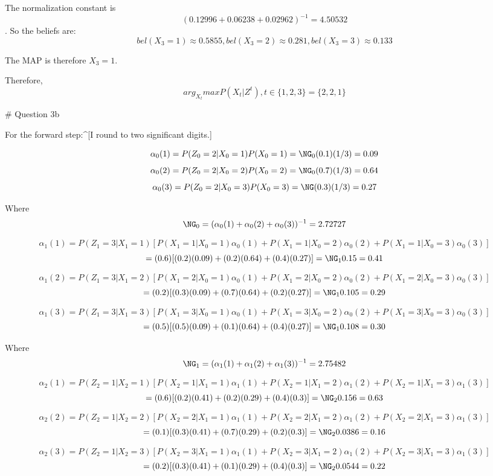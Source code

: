 The normalization constant is $$ (0.12996 + 0.06238 + 0.02962)^{-1} = 4.50532 $$. So the beliefs are: $$ bel(X_3 = 1) \approx 0.5855, bel(X_3 = 2) \approx 0.281, bel(X_3 = 3) \approx 0.133 $$

The MAP is therefore $X_3 = 1$.


Therefore, $$ arg_{X_t} max P(X_t | Z^t) , t \in \{1,2,3\} = \{2,2,1\}$$


# Question 3b

For the forward step:^[I round to two significant digits.]

$$ \alpha_0 (1)  = P(Z_0 = 2 | X_0 = 1) P(X_0 = 1) = \NG_0 (0.1)(1/3)  = 0.09 $$
$$ \alpha_0 (2)  = P(Z_0 = 2 | X_0 = 2) P(X_0 = 2) = \NG_0 (0.7)(1/3) = 0.64 $$
$$ \alpha_0 (3)  = P(Z_0 = 2 | X_0 = 3) P(X_0 = 3) = \NG (0.3)(1/3)  = 0.27 $$

Where $$ \NG_0 = (\alpha_0 (1) + \alpha_0 (2) + \alpha_0 (3))^{-1}  = 2.72727 $$

$$ \alpha_1 (1) = P(Z_1 = 3 | X_1 = 1) [ P(X_1 = 1 | X_0 = 1) \alpha_0 (1) + P(X_1 = 1 | X_0 = 2) \alpha_0 (2) + P(X_1 = 1 | X_0 = 3) \alpha_0 (3) ] $$
$$ = (0.6) [ (0.2)(0.09) + (0.2)(0.64)  + (0.4)(0.27)] = \NG_1 0.15  = 0.41 $$

$$ \alpha_1 (2) = P(Z_1 = 3 | X_1 = 2) [ P(X_1 = 2 | X_0 = 1) \alpha_0 (1) + P(X_1 = 2 | X_0 = 2) \alpha_0 (2) + P(X_1 = 2 | X_0 = 3) \alpha_0 (3) ] $$
$$ = (0.2) [ (0.3)(0.09) + (0.7)(0.64)  + (0.2)(0.27)] = \NG_1 0.105 = 0.29 $$

$$ \alpha_1 (3) = P(Z_1 = 3 | X_1 = 3) [ P(X_1 = 3 | X_0 = 1) \alpha_0 (1) + P(X_1 = 3 | X_0 = 2) \alpha_0 (2) + P(X_1 = 3 | X_0 = 3) \alpha_0 (3) ] $$
$$ = (0.5) [ (0.5)(0.09) + (0.1)(0.64)  + (0.4)(0.27)] = \NG_1 0.108  = 0.30 $$

Where $$ \NG_1 = (\alpha_1 (1) + \alpha_1 (2) + \alpha_1 (3))^{-1}  = 2.75482 $$

$$ \alpha_2 (1) = P(Z_2 = 1 | X_2 = 1) [ P(X_2 = 1 | X_1 = 1) \alpha_1 (1) + P(X_2 = 1 | X_1 = 2) \alpha_1 (2) + P(X_2 = 1 | X_1 = 3) \alpha_1 (3) ] $$
$$ = (0.6) [ (0.2)(0.41) + (0.2)(0.29)   + (0.4)(0.3)] = \NG_2 0.156 = 0.63 $$

$$ \alpha_2 (2) = P(Z_2 = 1 | X_2 = 2) [ P(X_2 = 2 | X_1 = 1) \alpha_1 (1) + P(X_2 = 2 | X_1 = 2) \alpha_1 (2) + P(X_2 = 2 | X_1 = 3) \alpha_1 (3) ] $$
$$ = (0.1) [ (0.3)(0.41) + (0.7)(0.29)   + (0.2)(0.3)] = \NG_2 0.0386 =  0.16 $$

$$ \alpha_2 (3) = P(Z_2 = 1 | X_2 = 3) [ P(X_2 = 3 | X_1 = 1) \alpha_1 (1) + P(X_2 = 3 | X_1 = 2) \alpha_1 (2) + P(X_2 = 3 | X_1 = 3) \alpha_1 (3) ] $$
$$ = (0.2) [ (0.3)(0.41) + (0.1)(0.29)   + (0.4)(0.3)] = \NG_2 0.0544 =  0.22 $$

